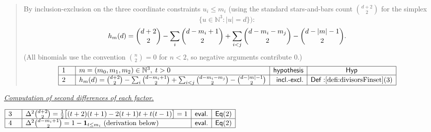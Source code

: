 \documentclass[11pt,reqno]{amsart}
\providecommand{\N}{\mathbb{N}}
\begin{document}
\begin{quotation}
\noindent%
By inclusion-exclusion on the three coordinate constraints $u_{i}\leq m_{i}$
(using the standard stars-and-bars count $\binom{d+2}{2}$ for the simplex%
\begin{equation*}
\{u\in \N^{3}:|u|=d\}):
\end{equation*}%
\begin{equation*}
h_{m}(d)=\binom{d+2}{2}-\sum_{i}\binom{d-m_{i}+1}{2}+\sum_{i<j}\binom{%
d-m_{i}-m_{j}}{2}-\binom{d-|m|-1}{2}.
\end{equation*}%
\noindent%
(All binomials use the convention $\binom{n}{2}=0$ for $n<2$, so negative
arguments contribute 0.)%
\begin{equation*}
\begin{array}{|m{0.5cm}|l|r|c|}
\hline
1 & m=(m_{0},m_{1},m_{2})\in \N^{3},\;t>0 & \mathsf{hypothesis} & \mathsf{Hyp%
} \\ \hline
2 & h_{m}(d)=\binom{d+2}{2}-\sum_{i}\binom{d-m_{i}+1}{2}+\sum_{i<j}\binom{%
d-m_{i}-m_{j}}{2}-\binom{d-|m|-1}{2} & \mathsf{incl.\text{-}excl.} & \mathsf{%
Def:}\ref{defi:divisorsFinset}(3) \\ \hline
\end{array}%
\end{equation*}
\end{quotation}

\nointerlineskip\noindent 

\bigskip 

\medskip%

\underline{\textit{Computation of second differences of each factor.}}

\bigskip 

\medskip%

\bigskip 

\nointerlineskip\noindent$%
\begin{array}{|m{0.5cm}|l|r|c|}
\hline
3 & \Delta^{2}\binom{d+2}{2}=\tfrac{1}{2}\bigl[(t+2)(t+1)-2(t+1)t+t(t-1)%
\bigr]=1 & \mathsf{eval.} & \mathsf{Eq}(2) \\ \hline
4 & \Delta^{2}\binom{d-m_{i}+1}{2}=1-\mathbf{1}_{t\le m_{i}}\ \text{%
(derivation below)} & \mathsf{eval.} & \mathsf{Eq}(2) \\ \hline
\end{array}%
$
\end{document}
